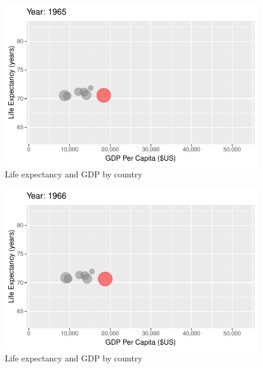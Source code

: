 \documentclass[
  letterpaper,
  DIV=11,
  numbers=noendperiod]{scrreport}
\theoremstyle{definition}
\theoremstyle{remark}
\begin{document}
\begin{figure}

{\centering \includegraphics{index_files/figure-pdf/fig-anim-country-25.pdf}

}

\caption{\label{fig-anim-country-25}Life expectancy and GDP by country}

\end{figure}

\begin{figure}

{\centering \includegraphics{index_files/figure-pdf/fig-anim-country-26.pdf}

}

\caption{\label{fig-anim-country-26}Life expectancy and GDP by country}

\end{figure}
\end{document}
